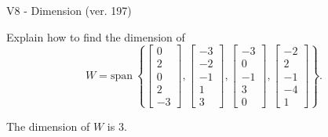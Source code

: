 \begin{exercise}
  \begin{exerciseTitle}V8 - Dimension (ver. 197)\end{exerciseTitle}
  \begin{exerciseStatement}
    Explain how to find the dimension of 
\[W=\mathrm{span}\ \left\{\left[\begin{array}{r}
0 \\
2 \\
0 \\
2 \\
-3
\end{array}\right] , \left[\begin{array}{r}
-3 \\
-2 \\
-1 \\
1 \\
3
\end{array}\right] , \left[\begin{array}{r}
-3 \\
0 \\
-1 \\
3 \\
0
\end{array}\right] , \left[\begin{array}{r}
-2 \\
2 \\
-1 \\
-4 \\
1
\end{array}\right]\right\}.\]



  \end{exerciseStatement}
  \begin{exerciseAnswer}
   The dimension of \(W\) is  \(3\).
  


  \end{exerciseAnswer}
\end{exercise}